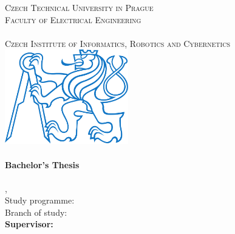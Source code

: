 
\begin{titlepage}
  \begin{center}

    \textsc{\Large Czech Technical University in Prague}\\[1em]
    \textsc{\large Faculty of Electrical Engineering\\
    \Department\\
    Czech Institute of Informatics, Robotics and Cybernetics\\[3em]
    }
    \includegraphics[height=4.1cm]{fig/ctu_logo_blue.pdf}\\[3em]

    \textbf{\textsc{\Huge \Title}}\\[2em]

    \textbf{\Large Bachelor's Thesis}\\[6em]

    \textbf{\huge \Author}\\[6em]

    {\large \Location, \Date}\\[3em]

    Study programme: \Programme\\
    Branch of study: \Field\\[4em]

    \textbf{Supervisor: \Supervisor}\\

    \vspace{2pt}

  \end{center}
\end{titlepage}
